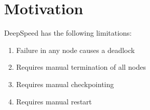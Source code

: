 \section{Motivation}
\label{sec:motivation}

DeepSpeed has the following limitations:

\begin{enumerate}
  \item Failure in any node causes a deadlock
  \item Requires manual termination of all nodes
  \item Requires manual checkpointing
  \item Requires manual restart
\end{enumerate}

